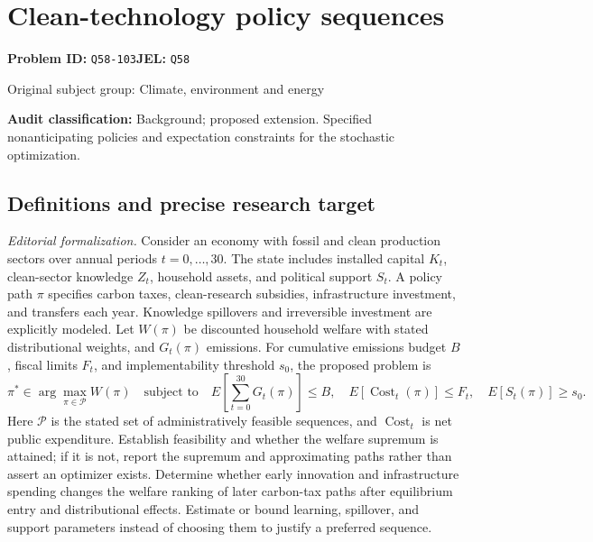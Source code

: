 \documentclass[11pt,a4paper]{article}
\begin{document}
\section*{Clean-technology policy sequences}
\textbf{Problem ID:} \texttt{Q58-103}\quad \textbf{JEL:} \texttt{Q58}\par
\label{problem:OP-0439}
{\sffamily\small\color{muted}Original subject group: Climate, environment and energy\par}
\label{definitions:problem:30007721}
\textbf{Audit classification:} Background; proposed extension. Specified nonanticipating policies and expectation constraints for the stochastic optimization.
\subsection*{Definitions and precise research target}
\textit{Editorial formalization.} Consider an economy with fossil and clean production sectors over annual periods \(t=0,\ldots,30\). The state includes installed capital \(K_t\), clean-sector knowledge \(Z_t\), household assets, and political support \(S_t\). A policy path \(\pi\) specifies carbon taxes, clean-research subsidies, infrastructure investment, and transfers each year. Knowledge spillovers and irreversible investment are explicitly modeled. Let \(W(\pi)\) be discounted household welfare with stated distributional weights, and \(G_t(\pi)\) emissions. For cumulative emissions budget \(B\), fiscal limits \(F_t\), and implementability threshold \(s_0\), the proposed problem is
\[\pi^*\in\arg\max_{\pi\in\mathcal P}W(\pi)\quad\text{subject to}\quad E[\sum_{t=0}^{30}G_t(\pi)]\leq B,\quad E[\operatorname{Cost}_t(\pi)]\leq F_t,\quad E[S_t(\pi)]\geq s_0.\]
Here \(\mathcal P\) is the stated set of administratively feasible sequences, and \(\operatorname{Cost}_t\) is net public expenditure. Establish feasibility and whether the welfare supremum is attained; if it is not, report the supremum and approximating paths rather than assert an optimizer exists. Determine whether early innovation and infrastructure spending changes the welfare ranking of later carbon-tax paths after equilibrium entry and distributional effects. Estimate or bound learning, spillover, and support parameters instead of choosing them to justify a preferred sequence.
\end{document}
